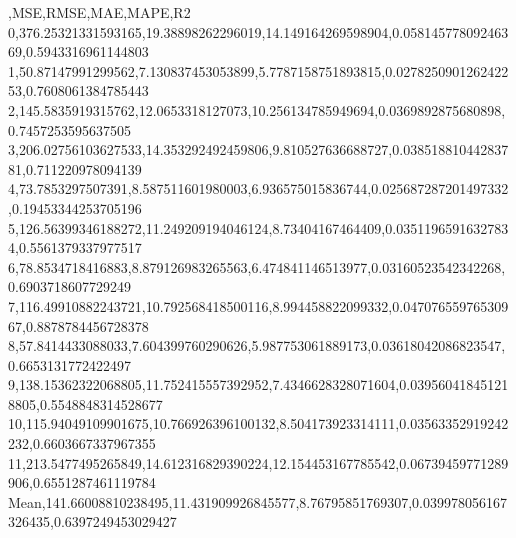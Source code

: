 ,MSE,RMSE,MAE,MAPE,R2
0,376.25321331593165,19.38898262296019,14.149164269598904,0.05814577809246369,0.5943316961144803
1,50.87147991299562,7.130837453053899,5.7787158751893815,0.027825090126242253,0.7608061384785443
2,145.5835919315762,12.0653318127073,10.256134785949694,0.0369892875680898,0.7457253595637505
3,206.02756103627533,14.353292492459806,9.810527636688727,0.03851881044283781,0.711220978094139
4,73.7853297507391,8.587511601980003,6.936575015836744,0.025687287201497332,0.19453344253705196
5,126.56399346188272,11.249209194046124,8.73404167464409,0.03511965916327834,0.5561379337977517
6,78.8534718416883,8.879126983265563,6.474841146513977,0.03160523542342268,0.6903718607729249
7,116.49910882243721,10.792568418500116,8.994458822099332,0.04707655976530967,0.8878784456728378
8,57.8414433088033,7.604399760290626,5.987753061889173,0.03618042086823547,0.6653131772422497
9,138.15362322068805,11.752415557392952,7.4346628328071604,0.039560418451218805,0.5548848314528677
10,115.94049109901675,10.766926396100132,8.504173923314111,0.03563352919242232,0.6603667337967355
11,213.5477495265849,14.612316829390224,12.154453167785542,0.06739459771289906,0.6551287461119784
Mean,141.66008810238495,11.431909926845577,8.76795851769307,0.039978056167326435,0.6397249453029427
